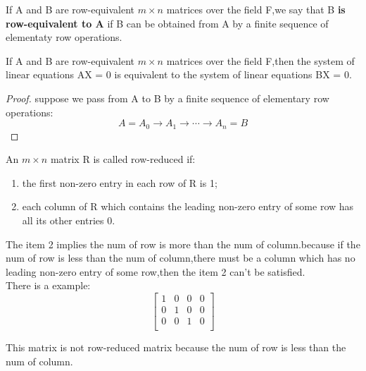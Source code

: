 \begin{definition}
	If A and B are row-equivalent \(m \times n\) matrices over the field F,we say that B \textbf{is row-equivalent to A} if B can be obtained from A by a finite sequence of elementaty row operations.
	\label{thm:row_equivalent}
\end{definition}


\begin{theorem}
	If A and B are row-equivalent \(m \times n\) matrices over the field F,then the system of linear equations AX = 0 is equivalent to the system of linear equations BX = 0.
\end{theorem}

\begin{proof}
	suppose we pass from A to B by a finite sequence of elementary row operations:
	\begin{equation}
		A = A_0 \rightarrow A_1 \rightarrow \cdots \rightarrow A_n = B
		\label{eq:proof_row_equivalent have same solution}
	\end{equation}
\end{proof}

\begin{definition}
	An $m \times n$ matrix R is called row-reduced if:
	\begin{enumerate}
		\item the first non-zero entry in each row of R is 1;
		\item each column of R which contains the leading non-zero entry of some row has all its other entries 0.
	\end{enumerate}
	\label{def:row_reduced_matrix}
\end{definition}
\begin{remark}
	The item 2 implies the num of row is more than the num of column.because if the num of row is less than the num of column,there must be a column which has no leading non-zero entry of some row,then the item 2 can't be satisfied.
	\\ There is a example:
	\begin{equation*}
		\begin{bmatrix}
			1 & 0 & 0 & 0 \\
			0 & 1 & 0 & 0 \\
			0 & 0 & 1 & 0 \\
		\end{bmatrix}
	\end{equation*}

	This matrix is not row-reduced matrix because the num of row is less than the num of column.

\end{remark}

